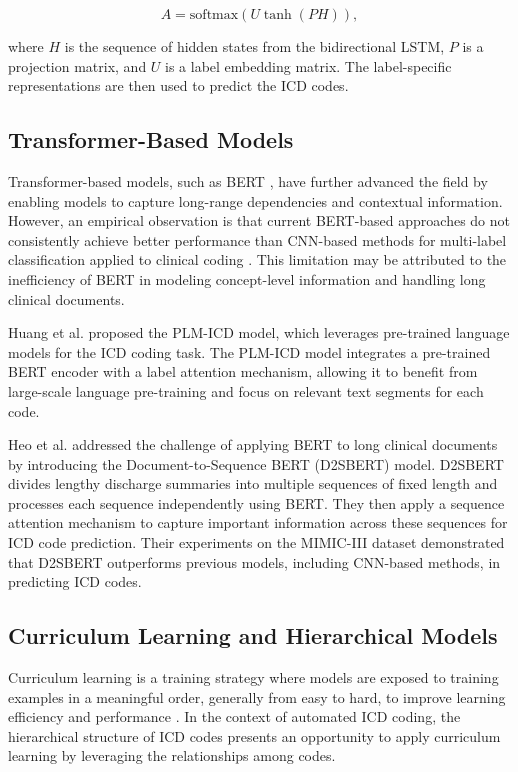 \documentclass[12pt,a4paper]{report}
\begin{document}
\begin{equation}
A = \text{softmax}(U \tanh(P H)),
\end{equation}

where $H$ is the sequence of hidden states from the bidirectional LSTM, $P$ is a projection matrix, and $U$ is a label embedding matrix. The label-specific representations are then used to predict the ICD codes.

\subsection{Transformer-Based Models}

Transformer-based models, such as BERT \cite{devlin2019bert}, have further advanced the field by enabling models to capture long-range dependencies and contextual information. However, an empirical observation is that current BERT-based approaches do not consistently achieve better performance than CNN-based methods for multi-label classification applied to clinical coding \cite{dong2022automated, gao2021limitations}. This limitation may be attributed to the inefficiency of BERT in modeling concept-level information and handling long clinical documents.

Huang et al. \cite{huang2022plm} proposed the PLM-ICD model, which leverages pre-trained language models for the ICD coding task. The PLM-ICD model integrates a pre-trained BERT encoder with a label attention mechanism, allowing it to benefit from large-scale language pre-training and focus on relevant text segments for each code.

Heo et al. \cite{heo2022medical} addressed the challenge of applying BERT to long clinical documents by introducing the Document-to-Sequence BERT (D2SBERT) model. D2SBERT divides lengthy discharge summaries into multiple sequences of fixed length and processes each sequence independently using BERT. They then apply a sequence attention mechanism to capture important information across these sequences for ICD code prediction. Their experiments on the MIMIC-III dataset demonstrated that D2SBERT outperforms previous models, including CNN-based methods, in predicting ICD codes.

\subsection{Curriculum Learning and Hierarchical Models}

Curriculum learning is a training strategy where models are exposed to training examples in a meaningful order, generally from easy to hard, to improve learning efficiency and performance \cite{bengio2009curriculum}. In the context of automated ICD coding, the hierarchical structure of ICD codes presents an opportunity to apply curriculum learning by leveraging the relationships among codes.
\end{document}
